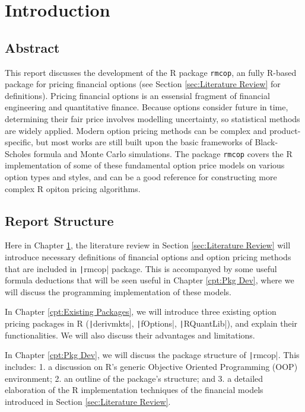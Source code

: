 \chapter{Introduction} \label{cpt:Introduction}

\section{Abstract}
This report discusses the development of the R package \texttt{rmcop}, an fully R-based package for pricing financial options (see Section \ref{sec:Literature Review} for definitions). Pricing financial options is an essensial fragment of financial engineering and quantitative finance. Because options consider future in time, determining their fair price involves modelling uncertainty, so statistical methods are widely applied. Modern option pricing methods can be complex and product-specific, but most works are still built upon the basic frameworks of Black-Scholes formula and Monte Carlo simulations. The package \texttt{rmcop} covers the R implementation of some of these fundamental option price models on various option types and styles, and can be a good reference for constructing more complex R opiton pricing algorithms.

\section{Report Structure}

Here in Chapter \ref{cpt:Introduction}, the literature review in Section \ref{sec:Literature Review} will introduce necessary definitions of financial options and option pricing methods that are included in \texttt|rmcop| package. This is accompanyed by some useful formula deductions that will be seen useful in Chapter \ref{cpt:Pkg Dev}, where we will discuss the programming implementation of these models.

In Chapter \ref{cpt:Existing Packages}, we will introduce three existing option pricing packages in R (\texttt|derivmkts|, \texttt|fOptions|, \texttt|RQuantLib|), and explain their functionalities. We will also discuss their advantages and limitations.

In Chapter \ref{cpt:Pkg Dev}, we will discuss the package structure of \texttt|rmcop|. This includes: 1. a discussion on R's generic Objective Oriented Programming (OOP) environment; 2. an outline of the package's structure; and 3. a detailed elaboration of the R implementation techniques of the financial models introduced in Section \ref{sec:Literature Review}.

